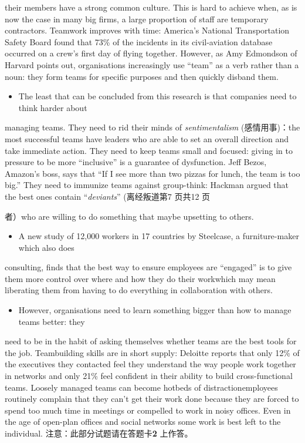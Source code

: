 \documentclass[UTF8,11pt]{ctexart}
\begin{document}
their members have a strong common culture. This is hard to achieve when, as is now the case in many big firms, a large proportion of staff are temporary contractors. Teamwork improves with time: America’s National Transportation Safety Board found that 73\% of the incidents in its civil-aviation database occurred on a crew’s first day of flying together. However, as Amy Edmondson of Harvard points out, organisations increasingly use “team” as a verb rather than a noun: they form teams for specific purposes and then quickly disband them.


\begin{itemize}[leftmargin=2em,itemsep=.2em,topsep=.4em]\item[H.] The least that can be concluded from this research is that companies need to think harder about
\end{itemize}

managing teams. They need to rid their minds of\textit{ sentimentalism} (感情用事)：the most successful teams have leaders who are able to set an overall direction and take immediate action. They need to keep teams small and focused: giving in to pressure to be more “inclusive” is a guarantee of dysfunction. Jeff Bezos, Amazon’s boss, says that “If I see more than two pizzas for lunch, the team is too big.” They need to immunize teams against group-think: Hackman argued that the best ones contain “\textit{deviants}” (离经叛道第7 页共12 页


者）who are willing to do something that maybe upsetting to others.


\begin{itemize}[leftmargin=2em,itemsep=.2em,topsep=.4em]\item[I.] A new study of 12,000 workers in 17 countries by Steelcase, a furniture-maker which also does
\end{itemize}

consulting, finds that the best way to ensure employees are “engaged” is to give them more control over where and how they do their work\textemdash{}which may mean liberating them from having to do everything in collaboration with others.


\begin{itemize}[leftmargin=2em,itemsep=.2em,topsep=.4em]\item[J.] However, organisations need to learn something bigger than how to manage teams better: they
\end{itemize}

need to be in the habit of asking themselves whether teams are the best tools for the job. Teambuilding skills are in short supply: Deloitte reports that only 12\% of the executives they contacted feel they understand the way people work together in networks and only 21\% feel confident in their ability to build cross-functional teams. Loosely managed teams can become hotbeds of distraction\textemdash{}employees routinely complain that they can’t get their work done because they are forced to spend too much time in meetings or compelled to work in noisy offices. Even in the age of open-plan offices and social networks some work is best left to the individual. 注意：此部分试题请在答题卡\textbf{2} 上作答。
\end{document}
